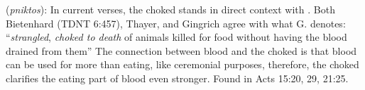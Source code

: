 \item[Choked,]

(\textit{pniktos}):
In current verses, the choked stands in direct context with . Both Bietenhard (TDNT 6:457), Thayer, and Gingrich agree with what G. denotes: ``\emph{strangled}, \emph{choked to death} of animals killed for food without having the blood drained from them'' The connection between blood and the choked is that blood can be used for more than eating, like ceremonial purposes, therefore, the choked clarifies the eating part of blood even stronger.
Found in Acts 15:20, 29, 21:25.
